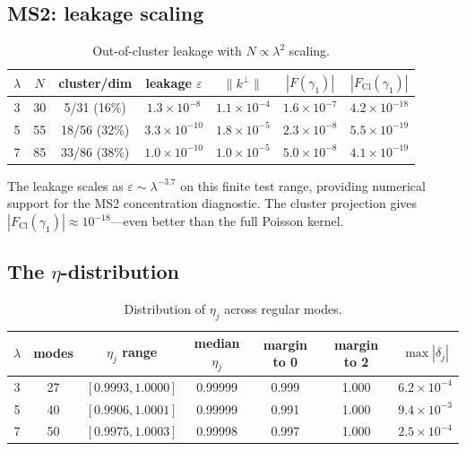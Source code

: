 \documentclass[12pt,a4paper]{article}
\theoremstyle{definition}
\theoremstyle{remark}
\newcommand{\Cl}{\mathrm{Cl}}
\newcommand{\norm}[1]{\| #1 \|}
\begin{document}
\subsection{MS2: leakage scaling}

\begin{table}[h]
\centering
\caption{Out-of-cluster leakage with $N \propto \lambda^2$ scaling.}
\label{tab:leakage}
\begin{tabular}{ccccccc}
\toprule
$\lambda$ & $N$ & cluster/dim & leakage $\varepsilon$ &
  $\norm{k^\perp}$ & $|F({\gamma_1})|$ & $|F_{\Cl}(\gamma_1)|$ \\
\midrule
3 & 30 & 5/31 (16\%) & $1.3 \times 10^{-8}$ & $1.1 \times 10^{-4}$ &
  $1.6 \times 10^{-7}$ & $4.2 \times 10^{-18}$ \\
5 & 55 & 18/56 (32\%) & $3.3 \times 10^{-10}$ & $1.8 \times 10^{-5}$ &
  $2.3 \times 10^{-8}$ & $5.5 \times 10^{-19}$ \\
7 & 85 & 33/86 (38\%) & $1.0 \times 10^{-10}$ & $1.0 \times 10^{-5}$ &
  $5.0 \times 10^{-8}$ & $4.1 \times 10^{-19}$ \\
\bottomrule
\end{tabular}
\end{table}

The leakage scales as $\varepsilon \sim \lambda^{-3.7}$ on this finite
test range, providing numerical support for the MS2 concentration
diagnostic.
The cluster projection gives $|F_{\Cl}(\gamma_1)| \approx 10^{-18}$---even
better than the full Poisson kernel.

\subsection{The \texorpdfstring{$\eta$}{eta}-distribution}

\begin{table}[h]
\centering
\caption{Distribution of $\eta_j$ across regular modes.}
\label{tab:eta}
\begin{tabular}{ccccccc}
\toprule
$\lambda$ & modes & $\eta_j$ range & median $\eta_j$ &
  margin to 0 & margin to 2 & $\max|\delta_j|$ \\
\midrule
3 & 27 & $[0.9993, 1.0000]$ & 0.99999 & 0.999 & 1.000 &
  $6.2 \times 10^{-4}$ \\
5 & 40 & $[0.9906, 1.0001]$ & 0.99999 & 0.991 & 1.000 &
  $9.4 \times 10^{-3}$ \\
7 & 50 & $[0.9975, 1.0003]$ & 0.99998 & 0.997 & 1.000 &
  $2.5 \times 10^{-4}$ \\
\bottomrule
\end{tabular}
\end{table}
\end{document}
